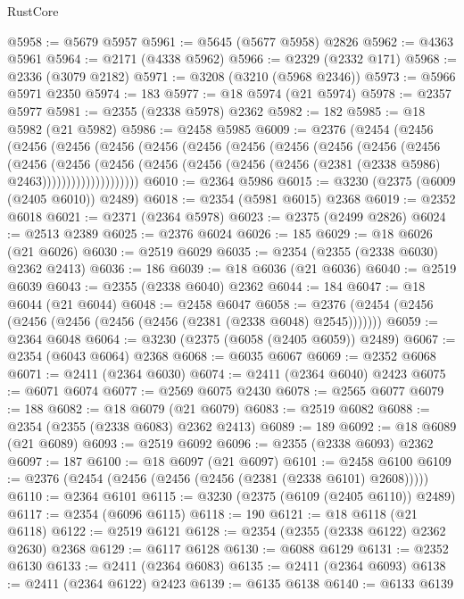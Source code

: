 \begin{lexlean}{RustCore}
\begin{coremodule}
@5958 := @5679 @5957
@5961 := @5645 (@5677 @5958) @2826
@5962 := @4363 @5961
@5964 := @2171 (@4338 @5962)
@5966 := @2329 (@2332 @171)
@5968 := @2336 (@3079 @2182)
@5971 := @3208 (@3210 (@5968 @2346))
@5973 := @5966 @5971 @2350
@5974 := 183
@5977 := @18 @5974 (@21 @5974)
@5978 := @2357 @5977
@5981 := @2355 (@2338 @5978) @2362
@5982 := 182
@5985 := @18 @5982 (@21 @5982)
@5986 := @2458 @5985
@6009 := @2376
    (@2454
      (@2456
        (@2456
          (@2456
            (@2456
              (@2456
                (@2456
                  (@2456
                    (@2456
                      (@2456
                        (@2456
                          (@2456
                            (@2456
                              (@2456
                                (@2456
                                  (@2456
                                    (@2456
                                      (@2456 (@2456 (@2381 (@2338 @5986) @2463))))))))))))))))))))
@6010 := @2364 @5986
@6015 := @3230 (@2375 (@6009 (@2405 @6010)) @2489)
@6018 := @2354 (@5981 @6015) @2368
@6019 := @2352 @6018
@6021 := @2371 (@2364 @5978)
@6023 := @2375 (@2499 @2826)
@6024 := @2513 @2389
@6025 := @2376 @6024
@6026 := 185
@6029 := @18 @6026 (@21 @6026)
@6030 := @2519 @6029
@6035 := @2354 (@2355 (@2338 @6030) @2362 @2413)
@6036 := 186
@6039 := @18 @6036 (@21 @6036)
@6040 := @2519 @6039
@6043 := @2355 (@2338 @6040) @2362
@6044 := 184
@6047 := @18 @6044 (@21 @6044)
@6048 := @2458 @6047
@6058 := @2376 (@2454 (@2456 (@2456 (@2456 (@2456 (@2456 (@2381 (@2338 @6048) @2545)))))))
@6059 := @2364 @6048
@6064 := @3230 (@2375 (@6058 (@2405 @6059)) @2489)
@6067 := @2354 (@6043 @6064) @2368
@6068 := @6035 @6067
@6069 := @2352 @6068
@6071 := @2411 (@2364 @6030)
@6074 := @2411 (@2364 @6040) @2423
@6075 := @6071 @6074
@6077 := @2569 @6075 @2430
@6078 := @2565 @6077
@6079 := 188
@6082 := @18 @6079 (@21 @6079)
@6083 := @2519 @6082
@6088 := @2354 (@2355 (@2338 @6083) @2362 @2413)
@6089 := 189
@6092 := @18 @6089 (@21 @6089)
@6093 := @2519 @6092
@6096 := @2355 (@2338 @6093) @2362
@6097 := 187
@6100 := @18 @6097 (@21 @6097)
@6101 := @2458 @6100
@6109 := @2376 (@2454 (@2456 (@2456 (@2456 (@2381 (@2338 @6101) @2608)))))
@6110 := @2364 @6101
@6115 := @3230 (@2375 (@6109 (@2405 @6110)) @2489)
@6117 := @2354 (@6096 @6115)
@6118 := 190
@6121 := @18 @6118 (@21 @6118)
@6122 := @2519 @6121
@6128 := @2354 (@2355 (@2338 @6122) @2362 @2630) @2368
@6129 := @6117 @6128
@6130 := @6088 @6129
@6131 := @2352 @6130
@6133 := @2411 (@2364 @6083)
@6135 := @2411 (@2364 @6093)
@6138 := @2411 (@2364 @6122) @2423
@6139 := @6135 @6138
@6140 := @6133 @6139

\end{coremodule}
\end{lexlean}
